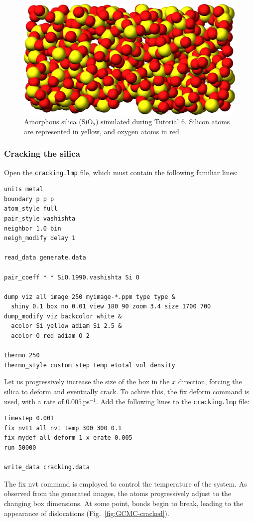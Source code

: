\documentclass[9pt,tutorial]{livecoms}
\newcommand{\lmpcmd}[1]{\hspace{0pt}\colorbox{listing}{\textcolor{command}{\small{#1}}}\hspace{0pt}} %
\newcommand{\flecmd}[1]{\textcolor{command}{\texttt{#1}}} %
\begin{document}
\begin{figure}
\centering
\includegraphics[width=0.9\linewidth]{GCMC-generate}
\caption{Amorphous silica ($\text{SiO}_2$) simulated
during \hyperref[gcmc-silica-label]{Tutorial 6}.  Silicon atoms are
represented in yellow, and oxygen atoms in red.}
\label{fig:GCMC-snapshot}
\end{figure}

\subsubsection{Cracking the silica}

Open the \flecmd{cracking.lmp} file, which must contain the following familiar lines:
\begin{lstlisting}
units metal
boundary p p p
atom_style full
pair_style vashishta
neighbor 1.0 bin
neigh_modify delay 1

read_data generate.data

pair_coeff * * SiO.1990.vashishta Si O

dump viz all image 250 myimage-*.ppm type type &
  shiny 0.1 box no 0.01 view 180 90 zoom 3.4 size 1700 700
dump_modify viz backcolor white &
  acolor Si yellow adiam Si 2.5 &
  acolor O red adiam O 2

thermo 250
thermo_style custom step temp etotal vol density
\end{lstlisting}

Let us progressively increase the size of the box in the $x$ direction,
forcing the silica to deform and eventually crack.  To achive this,
the \lmpcmd{fix deform} command is used, with a rate
of $0.005\,\text{ps}^{-1}$.  Add the following lines to
the \flecmd{cracking.lmp} file:
\begin{lstlisting}
timestep 0.001
fix nvt1 all nvt temp 300 300 0.1
fix mydef all deform 1 x erate 0.005
run 50000

write_data cracking.data
\end{lstlisting}
The \lmpcmd{fix nvt} command is employed to control the temperature of the system.
As observed from the generated images, the atoms
progressively adjust to the changing box dimensions.  At some point,
bonds begin to break, leading to the appearance of
dislocations (Fig.~\ref{fig:GCMC-cracked}).
\end{document}
